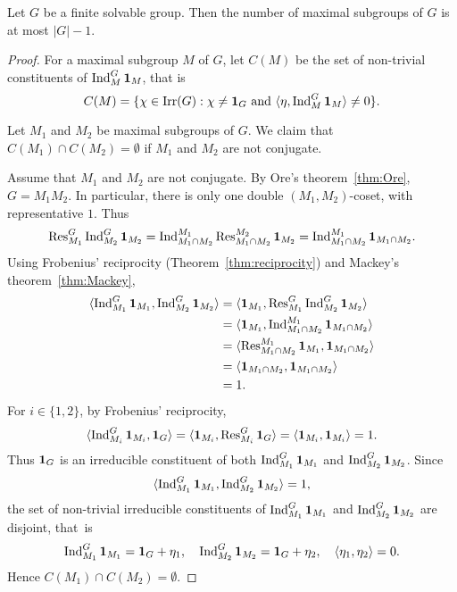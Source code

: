 \begin{theorem}[Wall]
\label{thm:Wall}
Let $G$ be a finite solvable group. Then the number of maximal subgroups of $G$ is at most $|G|-1$. 
\end{theorem}

\begin{proof}
    For a maximal subgroup $M$ of $G$, let 
    $C(M)$ be the set of non-trivial constituents
    of $\operatorname{Ind}_M^G\mathbf{1}_M$, that is
    \[
    C(M)=\{\chi\in\operatorname{Irr}(G):\chi\ne\mathbf{1}_G\text{ and }\langle\eta,\operatorname{Ind}_M^G\mathbf{1}_M\rangle\ne0\}.
    \]

    Let $M_1$ and $M_2$ be maximal subgroups of $G$. 
    We claim that $C(M_1)\cap C(M_2)=\emptyset$ if $M_1$ and $M_2$ are
    not conjugate. 
    
    Assume that $M_1$ and $M_2$ are not conjugate. By  
    Ore's theorem~\ref{thm:Ore}, $G=M_1M_2$. In particular, 
    there is only one double $(M_1,M_2)$-coset, with representative $1$. Thus
    \[
    \operatorname{Res}_{M_1}^G\operatorname{Ind}_{M_2}^G\mathbf{1}_{M_2}=\operatorname{Ind}_{M_1\cap M_2}^{M_1}\operatorname{Res}_{M_1\cap M_2}^{M_2}\mathbf{1}_{M_2}
    =\operatorname{Ind}_{M_1\cap M_2}^{M_1}\mathbf{1}_{M_1\cap M_2}.
    \]
    Using Frobenius' reciprocity (Theorem~\ref{thm:reciprocity}) and 
    Mackey's theorem~\ref{thm:Mackey}, 
    \begin{align*}
    \langle\operatorname{Ind}_{M_1}^G\mathbf{1}_{M_1},\operatorname{Ind}_{M_2}^G\mathbf{1}_{M_2}\rangle
    &=\langle \mathbf{1}_{M_1},\operatorname{Res}_{M_1}^G\operatorname{Ind}_{M_2}^G\mathbf{1}_{M_2}\rangle\\
    &=\langle \mathbf{1}_{M_1},\operatorname{Ind}_{M_1\cap M_2}^{M_1}\mathbf{1}_{M_1\cap M_2}\rangle\\
    &=\langle \operatorname{Res}_{M_1\cap M_2}^{M_1}\mathbf{1}_{M_1},\mathbf{1}_{M_1\cap M_2}\rangle\\
    &=\langle \mathbf{1}_{M_1\cap M_2},\mathbf{1}_{M_1\cap M_2}\rangle\\
    &=1.
    \end{align*}
    For $i\in\{1,2\}$, by Frobenius' reciprocity, 
    \[
    \langle\operatorname{Ind}_{M_i}^G\mathbf{1}_{M_i},\mathbf{1}_G\rangle
    =\langle\mathbf{1}_{M_i},\operatorname{Res}_{M_i}^G\mathbf{1}_G\rangle=\langle \mathbf{1}_{M_i},\mathbf{1}_{M_i}\rangle=1.
    \]
    Thus $\mathbf{1}_{G}$ is an irreducible constituent of both 
    $\operatorname{Ind}_{M_1}^G\mathbf{1}_{M_1}$ and $\operatorname{Ind}_{M_2}^G\mathbf{1}_{M_2}$. Since 
    \[
    \langle\operatorname{Ind}_{M_1}^G\mathbf{1}_{M_1},\operatorname{Ind}_{M_2}^G\mathbf{1}_{M_2}\rangle=1,
    \]
    the set of non-trivial 
    irreducible
    constituents of $\operatorname{Ind}_{M_1}^G\mathbf{1}_{M_1}$ and $\operatorname{Ind}_{M_2}^G\mathbf{1}_{M_2}$ are disjoint, that~is  
    \[
    \operatorname{Ind}_{M_1}^G\mathbf{1}_{M_1}=\mathbf{1}_G+\eta_1,
    \quad 
    \operatorname{Ind}_{M_2}^G\mathbf{1}_{M_2}=\mathbf{1}_G+\eta_2,
    \quad 
    \langle\eta_1,\eta_2\rangle=0.
    \]
    Hence $C(M_1)\cap C(M_2)=\emptyset$. 


\end{proof}
